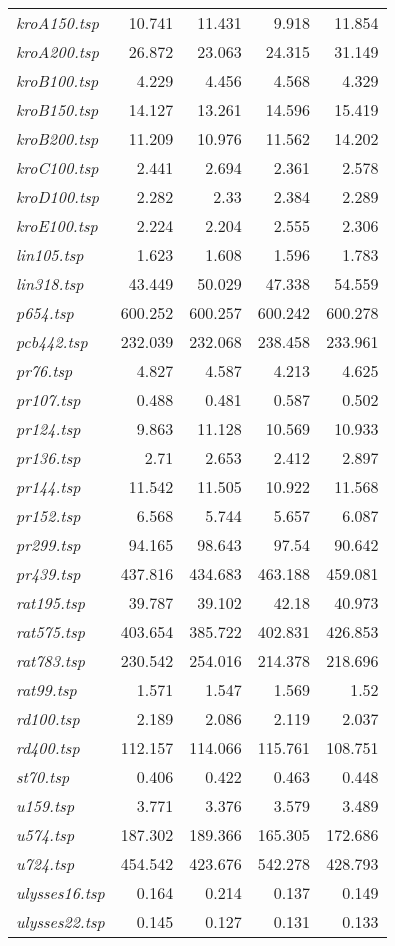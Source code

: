 {\begin{longtable}[H]{lrrrr}
\textit{kroA150.tsp} & 10.741 & 11.431 & 9.918 & 11.854\\
\textit{kroA200.tsp} & 26.872 & 23.063 & 24.315 & 31.149\\
\textit{kroB100.tsp} & 4.229 & 4.456 & 4.568 & 4.329\\
\textit{kroB150.tsp} & 14.127 & 13.261 & 14.596 & 15.419\\
\textit{kroB200.tsp} & 11.209 & 10.976 & 11.562 & 14.202\\
\textit{kroC100.tsp} & 2.441 & 2.694 & 2.361 & 2.578\\
\textit{kroD100.tsp} & 2.282 & 2.33 & 2.384 & 2.289\\
\textit{kroE100.tsp} & 2.224 & 2.204 & 2.555 & 2.306\\
\textit{lin105.tsp} & 1.623 & 1.608 & 1.596 & 1.783\\
\textit{lin318.tsp} & 43.449 & 50.029 & 47.338 & 54.559\\
\textit{p654.tsp} & 600.252 & 600.257 & 600.242 & 600.278\\
\textit{pcb442.tsp} & 232.039 & 232.068 & 238.458 & 233.961\\
\textit{pr76.tsp} & 4.827 & 4.587 & 4.213 & 4.625\\
\textit{pr107.tsp} & 0.488 & 0.481 & 0.587 & 0.502\\
\textit{pr124.tsp} & 9.863 & 11.128 & 10.569 & 10.933\\
\textit{pr136.tsp} & 2.71 & 2.653 & 2.412 & 2.897\\
\textit{pr144.tsp} & 11.542 & 11.505 & 10.922 & 11.568\\
\textit{pr152.tsp} & 6.568 & 5.744 & 5.657 & 6.087\\
\textit{pr299.tsp} & 94.165 & 98.643 & 97.54 & 90.642\\
\textit{pr439.tsp} & 437.816 & 434.683 & 463.188 & 459.081\\
\textit{rat195.tsp} & 39.787 & 39.102 & 42.18 & 40.973\\
\textit{rat575.tsp} & 403.654 & 385.722 & 402.831 & 426.853\\
\textit{rat783.tsp} & 230.542 & 254.016 & 214.378 & 218.696\\
\textit{rat99.tsp} & 1.571 & 1.547 & 1.569 & 1.52\\
\textit{rd100.tsp} & 2.189 & 2.086 & 2.119 & 2.037\\
\textit{rd400.tsp} & 112.157 & 114.066 & 115.761 & 108.751\\
\textit{st70.tsp} & 0.406 & 0.422 & 0.463 & 0.448\\
\textit{u159.tsp} & 3.771 & 3.376 & 3.579 & 3.489\\
\textit{u574.tsp} & 187.302 & 189.366 & 165.305 & 172.686\\
\textit{u724.tsp} & 454.542 & 423.676 & 542.278 & 428.793\\
\textit{ulysses16.tsp} & 0.164 & 0.214 & 0.137 & 0.149\\
\textit{ulysses22.tsp} & 0.145 & 0.127 & 0.131 & 0.133\\
\hline
\end{longtable}
}


